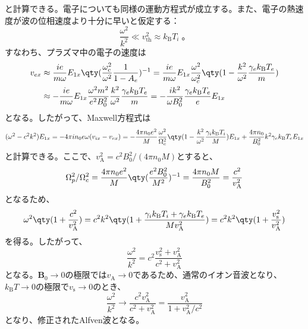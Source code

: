 と計算できる。電子についても同様の運動方程式が成立する。また、電子の熱速度が波の位相速度より十分に早いと仮定する：
\begin{equation}
	\frac{\omega^2}{k^2} \ll v_{\text{th}}^2 \approx k_{\text{B}}T_i\;。
\end{equation}
すなわち、プラズマ中の電子の速度は
\begin{align}
	v_{ex} & \approx \frac{ie}{m\omega}E_{1x}\qty(\frac{\omega^2_c}{\omega^2}\frac{1}{1-A_e})^{-1}
	= \frac{ie}{m\omega}E_{1x}\frac{\omega^2}{\omega_c^2}\qty(1-\frac{k^2}{\omega^2}\frac{\gamma_ek_{\text{B}}T_e}{m})                                                                               \\
	       & \approx -\frac{ie}{m\omega}E_{1x}\frac{\omega^2m^2}{e^2B_0^2}\frac{k^2}{\omega^2}\frac{\gamma_ek_{\text{B}}T_e}{m} = -\frac{ik^2}{\omega{}B_0^2}\frac{\gamma_ek_{\text{B}}T_e}{e}E_{1x}
\end{align}
となる。したがって、Maxwell方程式は
\begin{equation}
	(\omega^2 - c^2k^2)E_{1x} = -4\pi{}in_0e\omega(v_{ix}-v_{ex})
	= -\frac{4\pi{}n_0e^2}{M}\frac{\omega^2}{\Omega^2_c}\qty(1-\frac{k^2}{\omega^2}\frac{\gamma_ik_{\text{B}}T_i}{M})E_{1x} + \frac{4\pi{}n_0}{B_0^2}k^2\gamma_ek_{\text{B}}T_eE_{1x}
\end{equation}
と計算できる。ここで、$v_{\text{A}}^2 = c^2B_0^2/(4\pi{}n_0M)$とすると、
\begin{equation}
	\Omega_{p}^2/\Omega_c^2 = \frac{4\pi{}n_0e^2}{M}\qty(\frac{e^2B_0^2}{M^2})^{-1} = \frac{4\pi{}n_0M}{B_0^2} = \frac{c^2}{v_{\text{A}}^2}
\end{equation}
となるため、
\begin{equation}
	\omega^2\qty(1+\frac{c^2}{v_{\text{A}}^2}) = c^2k^2\qty(1 + \frac{\gamma_ik_{\text{B}}T_i + \gamma_ek_{\text{B}}T_e}{Mv_{\text{A}}^2}) = c^2k^2\qty(1 + \frac{v_{\text{s}}^2}{v_{\text{A}}^2})
\end{equation}
を得る。したがって、
\begin{equation}
	\frac{\omega^2}{k^2} = c^2\frac{v_{\text{s}}^2 + v_{\text{A}}^2}{c^2+v_{\text{A}}^2}
\end{equation}
となる。$\bm{B}_0\to 0$の極限では$v_{\text{A}}\to 0$であるため、通常のイオン音波となり、$k_{\text{B}}T\to 0$の極限で$v_{\text{s}}\to 0$のとき、
\begin{equation}
	\frac{\omega^2}{k^2} \to \frac{c^2v_{\text{A}}^2}{c^2+v_{\text{A}}^2} = \frac{v_{\text{A}}^2}{1 + v_{\text{A}}^2/c^2}
\end{equation}
となり、修正されたAlfven波となる。



